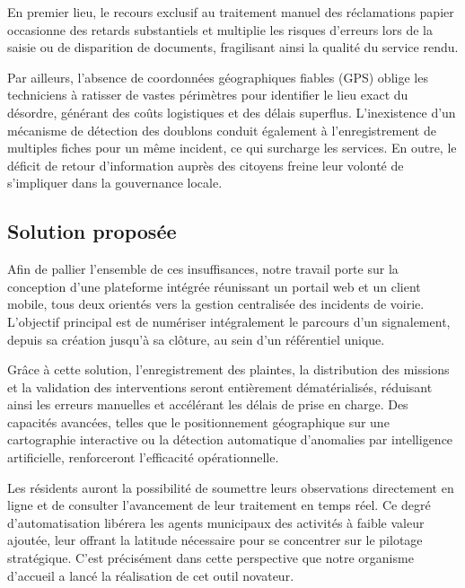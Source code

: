 En premier lieu, le recours exclusif au traitement manuel des réclamations papier occasionne des retards substantiels et multiplie les risques d'erreurs lors de la saisie ou de disparition de documents, fragilisant ainsi la qualité du service rendu.

Par ailleurs, l'absence de coordonnées géographiques fiables (GPS) oblige les techniciens à ratisser de vastes périmètres pour identifier le lieu exact du désordre, générant des coûts logistiques et des délais superflus. L'inexistence d'un mécanisme de détection des doublons conduit également à l'enregistrement de multiples fiches pour un même incident, ce qui surcharge les services. En outre, le déficit de retour d'information auprès des citoyens freine leur volonté de s'impliquer dans la gouvernance locale.

\subsection{Solution proposée}
Afin de pallier l'ensemble de ces insuffisances, notre travail porte sur la conception d'une plateforme intégrée réunissant un portail web et un client mobile, tous deux orientés vers la gestion centralisée des incidents de voirie. L'objectif principal est de numériser intégralement le parcours d'un signalement, depuis sa création jusqu'à sa clôture, au sein d'un référentiel unique.

Grâce à cette solution, l'enregistrement des plaintes, la distribution des missions et la validation des interventions seront entièrement dématérialisés, réduisant ainsi les erreurs manuelles et accélérant les délais de prise en charge. Des capacités avancées, telles que le positionnement géographique sur une cartographie interactive ou la détection automatique d'anomalies par intelligence artificielle, renforceront l'efficacité opérationnelle.

Les résidents auront la possibilité de soumettre leurs observations directement en ligne et de consulter l'avancement de leur traitement en temps réel. Ce degré d'automatisation libérera les agents municipaux des activités à faible valeur ajoutée, leur offrant la latitude nécessaire pour se concentrer sur le pilotage stratégique. C'est précisément dans cette perspective que notre organisme d'accueil a lancé la réalisation de cet outil novateur.

